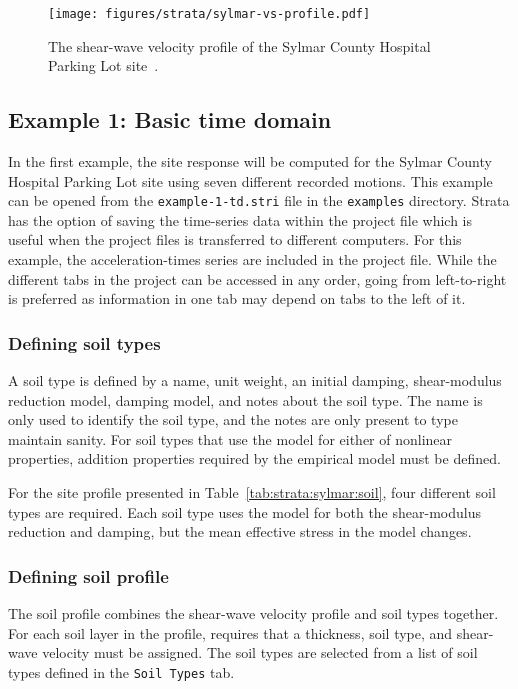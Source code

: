 \documentclass[12pt,oneside]{book}
\begin{document}
\begin{figure}[tbp]
    \begin{center}
        \texttt{[image: figures/strata/sylmar-vs-profile.pdf]}
    \end{center}
    \caption{The shear-wave velocity profile of the Sylmar County Hospital Parking Lot
    site~\citep{chang:96}.}
    \label{fig:strata:sylmar:vsProfile}
\end{figure}

\subsection{Example 1: Basic time domain}\label{ch:strata:example:1}
In the first example, the site response will be computed for the Sylmar County Hospital Parking Lot
site using seven different recorded motions.  This example can be opened from the
\texttt{example-1-td.stri} file in the \texttt{examples} directory.  Strata has the option of saving
the time-series data within the project file which is useful when the project files is transferred
to different computers.  For this example, the acceleration-times series are included in the project
file.  While the different tabs in the project can be accessed in any order, going from
left-to-right is preferred as information in one tab may depend on tabs to the left of it.

\subsubsection{Defining soil types}
A soil type is defined by a name, unit weight, an initial damping, shear-modulus reduction model,
damping model, and notes about the soil type.  The name is only used to identify the soil type, and
the notes are only present to type maintain sanity.  For soil types that use the
\citet{darendeli:01} model for either of nonlinear properties, addition properties required by the
empirical model must be defined.

For the site profile presented in Table~\ref{tab:strata:sylmar:soil}, four different soil types are
required.  Each soil type uses the \citet{darendeli:01} model for both the shear-modulus reduction
and damping, but the mean effective stress in the model changes.

\subsubsection{Defining soil profile}
The soil profile combines the shear-wave velocity profile and soil types together.  For each soil
layer in the profile, requires that a thickness, soil type, and shear-wave velocity must be
assigned.  The soil types are selected from a list of soil types defined in the \texttt{Soil Types}
tab.
\end{document}
